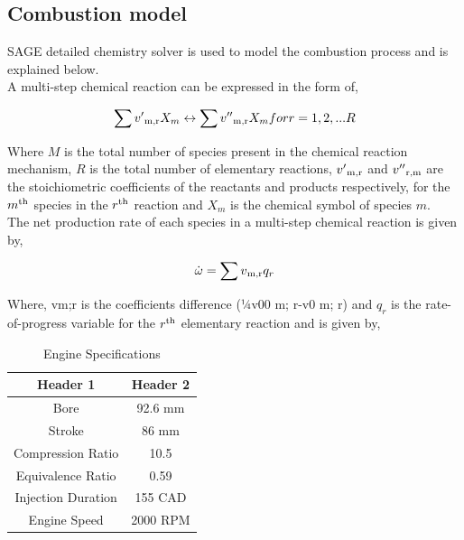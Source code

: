 \documentclass[conference]{IEEEtran}
\begin{document}
\subsection{Combustion model}
SAGE detailed chemistry solver is used to model the combustion process and is explained below.\\
A multi-step chemical reaction can be expressed in the form of,

\begin{gather*}
    \sum v'\textsubscript{m,r} X_m \leftrightarrow \sum v''\textsubscript{m,r} X_m for  r = 1,2,...R
\end{gather*}

Where $M$ is the total number of species present in the chemical reaction mechanism, $R$ is the total number of elementary reactions, $v'\textsubscript{m,r}$ and $v''\textsubscript{r,m}$ are the stoichiometric coefficients of the reactants and products respectively, for the $m\textsuperscript{th}$ species in the $r\textsuperscript{th}$ reaction and $X_m$ is the chemical symbol of species $m$.\\

The net production rate of each species in a multi-step chemical reaction is given by,

\begin{gather*}
    \dot\omega = \sum v\textsubscript{m,r} q_r
\end{gather*}

Where, vm;r is the coefficients difference (¼v00 m; r-v0 m; r) and $q_r$ is the rate-of-progress variable for the $r\textsuperscript{th}$ elementary reaction and is given by,


\begin{table}[!ht]
    \centering
    \caption{Engine Specifications}
    \label{your_label_here}
    \begin{tabular}{|c|c|}
    \hline
    Header 1 & Header 2 \\
    \hline
    Bore & 92.6 mm \\
    Stroke & 86 mm \\
    Compression Ratio & 10.5 \\
    Equivalence Ratio & 0.59 \\
    Injection Duration & 155 CAD \\
    Engine Speed & 2000 RPM \\
    \hline
    \end{tabular}
    \end{table}
\end{document}
